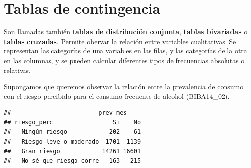 \documentclass[spanish,]{book}
\newenvironment{Shaded}{\begin{snugshade}}{\end{snugshade}}
\newcommand{\KeywordTok}[1]{\textcolor[rgb]{0.13,0.29,0.53}{\textbf{#1}}}
\newcommand{\DataTypeTok}[1]{\textcolor[rgb]{0.13,0.29,0.53}{#1}}
\newcommand{\DecValTok}[1]{\textcolor[rgb]{0.00,0.00,0.81}{#1}}
\newcommand{\StringTok}[1]{\textcolor[rgb]{0.31,0.60,0.02}{#1}}
\newcommand{\OperatorTok}[1]{\textcolor[rgb]{0.81,0.36,0.00}{\textbf{#1}}}
\newcommand{\NormalTok}[1]{#1}
\begin{document}
\section{Tablas de contingencia}\label{tablas-de-contingencia}

Son llamadas también \textbf{tablas de distribución conjunta},
\textbf{tablas bivariadas} o \textbf{tablas cruzadas}. Permite obervar
la relación entre variables cualitativas. Se representan las categorías
de una variables en las filas, y las categorías de la otra en las
columnas, y se pueden calcular diferentes tipos de frecuencias absolutas
o relativas.

Supongamos que queremos observar la relación entre la prevalencia de
consumo con el riesgo percibido para el consumo frecuente de alcohol
(BIBA14\_02).

\begin{Shaded}
\end{Shaded}

\begin{verbatim}
##                         prev_mes
## riesgo_perc                 Sí    No
##   Ningún riesgo            202    61
##   Riesgo leve o moderado  1701  1139
##   Gran riesgo            14261 16601
##   No sé que riesgo corre   163   215
\end{verbatim}
\end{document}
